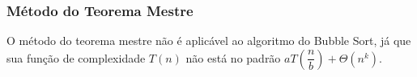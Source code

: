 \subsubsection{Método do Teorema Mestre}

O método do teorema mestre não é aplicável ao algoritmo do Bubble Sort, já que sua função de complexidade $T(n)$ não está no padrão \(aT
\left( \dfrac{n}{b} \right) + \Theta\left(n^k\right)\).
